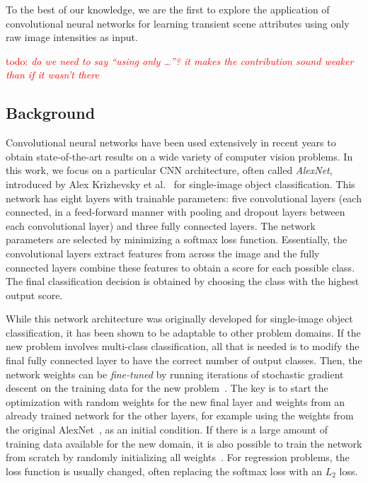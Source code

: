 \documentclass[10pt,twocolumn,letterpaper]{article}
\newcommand{\todo}[1]{\textcolor{red}{todo: {\em #1}}}
\begin{document}
To the best of our knowledge, we are the first to explore the application of
convolutional neural networks for learning transient scene attributes
using only raw image intensities as input.

\todo{do we need to say ``using only \dots''?  it makes the
contribution sound weaker than if it wasn't there}

\subsection{Background}

Convolutional neural networks have been used extensively in recent
years to obtain state-of-the-art results on a wide variety of computer vision
problems.  In this work, we focus on a particular CNN architecture, often
called {\em AlexNet}, introduced by Alex Krizhevsky et al.~\cite{caffenetnips12}
for single-image object classification. This network has eight layers with
trainable parameters: five convolutional layers (each connected, in a
feed-forward manner with pooling and dropout layers between each convolutional
layer) and three fully connected layers. The network parameters are selected by minimizing a
softmax loss function. Essentially, the convolutional layers
extract features from across the image and the fully connected layers combine
these features to obtain a score for each possible class. The final
classification decision is obtained by choosing the class with the highest
output score.  

While this network architecture was originally developed for single-image
object classification, it has been shown to be adaptable to other problem
domains. If the new problem involves multi-class classification, all that is
needed is to modify the final fully connected layer to have the correct number
of output classes. Then, the network weights can be {\em fine-tuned} by running
iterations of stochastic gradient descent on the training data for the new
problem~\cite{yosinski2014transferable}.  The key is to start the optimization
with random weights for the new final layer and weights from an already trained
network for the other layers, for example using the weights from the original
AlexNet~\cite{caffenetnips12}, as an initial condition. If there is a large
amount of training data available for the new domain, it is also possible to
train the network from scratch by randomly initializing all
weights~\cite{zhou2014places}.  For regression problems, the loss
function is usually changed, often replacing the softmax loss with an
$L_2$ loss.
\end{document}
